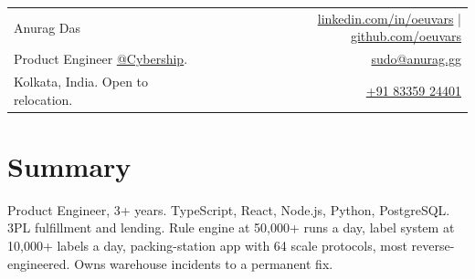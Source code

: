 \documentclass[a4paper,11pt]{article}
\newcommand{\name}{Anurag Das} %
\begin{document}

{
\begin{tabularx}{\linewidth}{L r}
  {\headingfont\Large \name} & \href{https://www.linkedin.com/in/oeuvars}{linkedin.com/in/oeuvars} | \href{https://github.com/oeuvars}{github.com/oeuvars} \\
  Product Engineer \href{https://cybership.io}{\underline {@Cybership}}. & \href{mailto:sudo@anurag.gg}{sudo@anurag.gg} \\
  Kolkata, India. Open to relocation. & \href{tel:+918335924401}{+91 83359 24401}
\end{tabularx}
}


\section{\textbf{Summary}}
  \small{Product Engineer, 3+ years. TypeScript, React, Node.js, Python, PostgreSQL. 3PL fulfillment and lending. Rule engine at 50,000+ runs a day, label system at 10,000+ labels a day, packing-station app with 64 scale protocols, most reverse-engineered. Owns warehouse incidents to a permanent fix.}
\vspace{-2mm}

\end{document}

